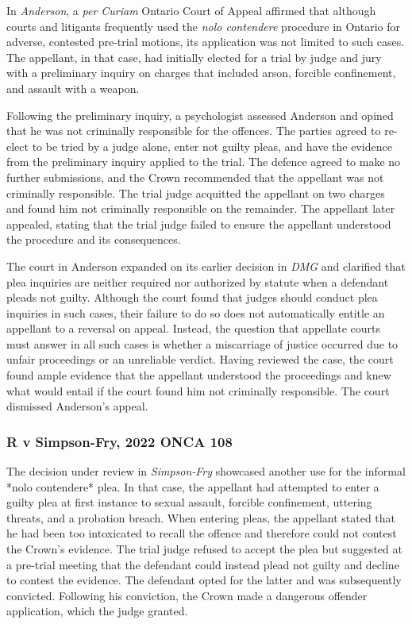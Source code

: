 In \textit{Anderson}, a \textit{per Curiam} Ontario Court of Appeal affirmed that although courts and litigants frequently used the \textit{nolo contendere}  procedure in Ontario for adverse, contested pre-trial motions, its application was not limited to such cases. The appellant, in that case, had initially elected for a trial by judge and jury with a preliminary inquiry on charges that included arson, forcible confinement, and assault with a weapon.

Following the preliminary inquiry, a psychologist assessed Anderson and opined that he was not criminally responsible for the offences. The parties agreed to re-elect to be tried by a judge alone, enter not guilty pleas, and have the evidence from the preliminary inquiry applied to the trial. The defence agreed to make no further submissions, and the Crown recommended that the appellant was not criminally responsible. The trial judge acquitted the appellant on two charges and found him not criminally responsible on the remainder. The appellant later appealed, stating that the trial judge failed to ensure the appellant understood the procedure and its consequences.

The court in Anderson expanded on its earlier decision in \textit{DMG} and clarified that plea inquiries are neither required nor authorized by statute when a defendant pleads not guilty. Although the court found that judges should conduct plea inquiries in such cases, their failure to do so does not automatically entitle an appellant to a reversal on appeal. Instead, the question that appellate courts must answer in all such cases is whether a miscarriage of justice occurred due to unfair proceedings or an unreliable verdict. Having reviewed the case, the court found ample evidence that the appellant understood the proceedings and knew what would entail if the court found him not criminally responsible. The court dismissed Anderson's appeal.

\subsubsection{R v Simpson-Fry, 2022 ONCA 108}

The decision under review in \textit{Simpson-Fry} showcased another use for the informal *nolo contendere* plea. In that case, the appellant had attempted to enter a guilty plea at first instance to sexual assault, forcible confinement, uttering threats, and a probation breach. When entering pleas, the appellant stated that he had been too intoxicated to recall the offence and therefore could not contest the Crown's evidence. The trial judge refused to accept the plea but suggested at a pre-trial meeting that the defendant could instead plead not guilty and decline to contest the evidence. The defendant opted for the latter and was subsequently convicted. Following his conviction, the Crown made a dangerous offender application, which the judge granted.

